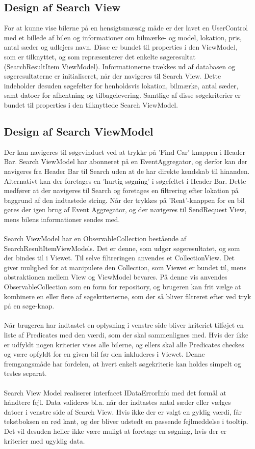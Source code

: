 \documentclass[SoftwareDesign/SoftwareDesign_main.tex]{subfiles}
\begin{document}
\subsection{Design af Search View}
For at kunne vise bilerne på en hensigtsmæssig måde er der lavet en UserControl med et billede af bilen og informationer om bilmærke- og model, lokation, pris, antal sæder og udlejers navn. Disse er bundet til properties i den ViewModel, som er tilknyttet, og som repræsenterer det enkelte søgeresultat (SearchResultItem ViewModel). Informationerne trækkes ud af databasen og søgeresultaterne er initialiseret, når der navigeres til Search View. Dette indeholder desuden søgefelter for henholdsvis lokation, bilmærke, antal sæder, samt datoer for afhentning og tilbagelevering. Samtlige af disse søgekriterier er bundet til properties i den tilknyttede Search ViewModel.

\subsection{Design af Search ViewModel}
Der kan navigeres til søgevinduet ved at trykke på 'Find Car' knappen i Header Bar. Search ViewModel har abonneret på en EventAggregator, og derfor kan der navigeres fra Header Bar til Search uden at de har direkte kendskab til hinanden. Alternativt kan der foretages en 'hurtig-søgning' i søgefeltet i Header Bar. Dette medfører at der navigeres til Search og foretages en filtrering efter lokation på baggrund af den indtastede string. Når der trykkes på 'Rent'-knappen for en bil gøres der igen brug af Event Aggregator, og der navigeres til SendRequest View, mens bilens informationer sendes med. \\\\Search ViewModel har en ObservableCollection bestående af SearchResultItemViewModels. Det er denne, som udgør søgeresultatet, og som der bindes til i Viewet. Til selve filtreringen anvendes et CollectionView. Det giver mulighed for at manipulere den Collection, som Viewet er bundet til, mens abstraktionen mellem View og ViewModel bevares. På denne vis anvendes ObservableCollection som en form for repository, og brugeren kan frit vælge at kombinere en eller flere af søgekriterierne, som der så bliver filtreret efter ved tryk på en søge-knap. \\\\Når brugeren har indtastet en oplysning i venstre side bliver kriteriet tilføjet en liste af Predicates med den værdi, som der skal sammenlignes med. Hvis der ikke er udfyldt nogen kriterier vises alle bilerne, og ellers skal alle Predicates checkes og være opfyldt for en given bil før den inkluderes i Viewet. Denne fremgangsmåde har fordelen, at hvert enkelt søgekriterie kan holdes simpelt og testes separat. \\\\Search View Model realiserer interfacet IDataErrorInfo med det formål at håndtere fejl. Data valideres bl.a. når der indtastes antal sæder eller vælges datoer i venstre side af Search View. Hvis ikke der er valgt en gyldig værdi, får tekstboksen en rød kant, og der bliver udstedt en passende fejlmeddelse i tooltip. Det vil desuden heller ikke være muligt at foretage en søgning, hvis der er kriterier med ugyldig data.
\end{document}

